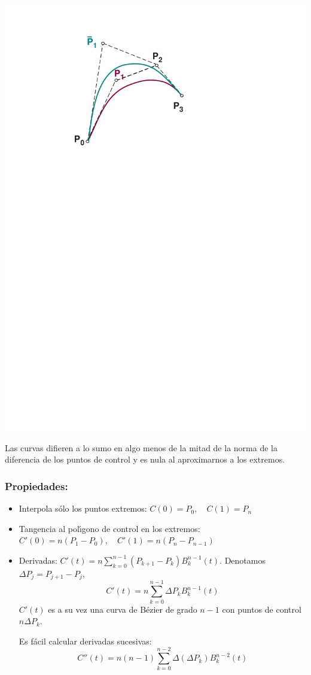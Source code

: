 \documentclass[ebook,oneside]{memoir}
\begin{document}
\begin{center}
\includegraphics[scale=0.4]{3_7.pdf}
\end{center}

Las curvas difieren a lo sumo en algo menos de la mitad de la norma de la diferencia de los puntos de control y es nula al aproximarnos a los extremos.

\subsubsection{Propiedades:}

\begin{itemize}
\item Interpola s\'{o}lo los puntos extremos: $C(0)=P_0,\quad C(1)=P_n$
\item Tangencia al pol\'{\i}gono de control en los extremos: $C'(0)=n(P_1-P_0),\quad C'(1)=n(P_n-P_{n-1})$
\item Derivadas: $C'(t)=n\sum_{k=0}^{n-1}(P_{k+1}-P_k)B_k^{n-1}(t).$ Denotamos $\Delta P_j=P_{j+1}-P_j,$
$$C'(t)=n\sum_{k=0}^{n-1}\Delta P_kB_k^{n-1}(t)$$ $C'(t)$ es a su vez una curva de B\'{e}zier de grado $n-1$ con puntos de control $n\Delta P_k.$

Es f\'{a}cil calcular derivadas sucesivas:
$$C''(t)=n(n-1)\sum_{k=0}^{n-2} \Delta(\Delta P_k)B_k^{n-2}(t)$$
\end{itemize}
\end{document}
